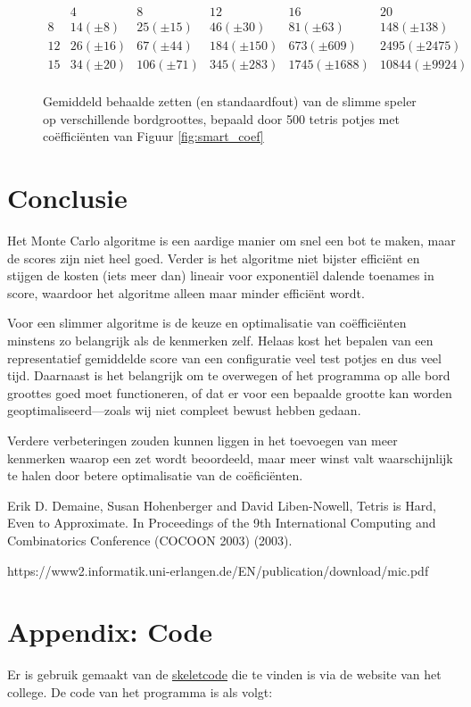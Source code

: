 \documentclass[10pt]{article}
\begin{document}
\begin{figure}
$$\begin{array}{l||c|c|c|c|c}
	    & 4 			& 8 			   & 12 			& 16 			 & 20 \\ 
	\hline\hline
	8  & 14 (\pm 8) 	& 25 (\pm 15) & 46 (\pm 30)  & 81 (\pm 63)  & 148 (\pm 138) \\
	12 & 26 (\pm 16) & 67 (\pm 44)    & 184 (\pm 150)     & 673 (\pm 609) & 2495 (\pm 2475)  \\
	15 & 34 (\pm 20) & 106 (\pm 71) & 345 (\pm 283)     & 1745 (\pm 1688) & 10844 (\pm 9924) \\
\end{array}$$
\caption{Gemiddeld behaalde zetten (en standaardfout) van de slimme speler op verschillende bordgroottes, bepaald door 500 tetris potjes met co\"effici\"enten van Figuur \ref{fig:smart_coef}}\label{fig:smart_bord}
\end{figure}

\section{Conclusie}

Het Monte Carlo algoritme is een aardige manier om snel een bot te maken, maar de scores zijn niet heel goed. Verder is het algoritme niet bijster effici\"ent en stijgen de kosten (iets meer dan) lineair voor exponenti\"el dalende toenames in score, waardoor het algoritme alleen maar minder effici\"ent wordt.

Voor een slimmer algoritme is de keuze en optimalisatie van co\"effici\"enten minstens zo belangrijk als de kenmerken zelf. Helaas kost het bepalen van een representatief gemiddelde score van een configuratie veel test potjes en dus veel tijd. Daarnaast is het belangrijk om te overwegen of het programma op alle bord groottes goed moet functioneren, of dat er voor een bepaalde grootte kan worden geoptimaliseerd---zoals wij niet compleet bewust hebben gedaan.

Verdere verbeteringen zouden kunnen liggen in het toevoegen van meer kenmerken waarop een zet wordt beoordeeld, maar meer winst valt waarschijnlijk te halen door betere optimalisatie van de co\"efici\"enten. 

\begin{thebibliography}{XX}

Erik D. Demaine, Susan Hohenberger and David Liben-Nowell, Tetris is
Hard, Even to Approximate. In Proceedings of the 9th International Computing and
Combinatorics Conference (COCOON 2003) (2003).

https://www2.informatik.uni-erlangen.de/EN/publication/download/mic.pdf

\end{thebibliography}

\section*{Appendix: Code}

Er is gebruik gemaakt van de \href{http://www.liacs.leidenuniv.nl/~kosterswa/AI/iets.cc}{\underline{skeletcode}} die te vinden is via
de website van het college.
De code van het programma is als volgt:

\smallskip


\end{document}
